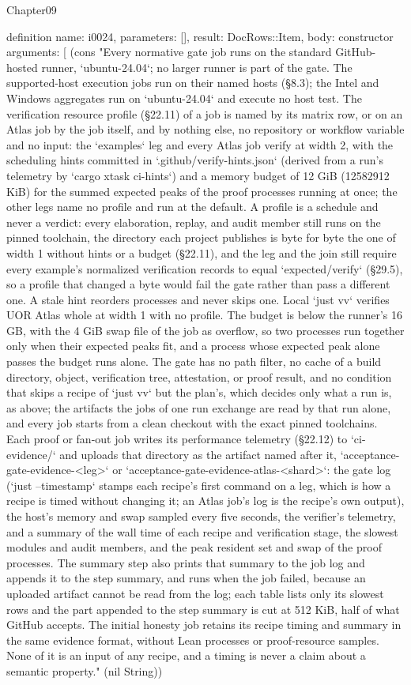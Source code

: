 \begin{lexlean}{Chapter09}
\begin{semanticmodule}
definition{
  name: i0024,
  parameters: [],
  result: DocRows::Item,
  body: constructor{
    arguments: [
      (cons "Every normative gate job runs on the standard GitHub-hosted runner, `ubuntu-24.04`; no larger runner is part of the gate. The supported-host execution jobs run on their named hosts (§8.3); the Intel and Windows aggregates run on `ubuntu-24.04` and execute no host test. The verification resource profile (§22.11) of a job is named by its matrix row, or on an Atlas job by the job itself, and by nothing else, no repository or workflow variable and no input: the `examples` leg and every Atlas job verify at width 2, with the scheduling hints committed in `.github/verify-hints.json` (derived from a run's telemetry by `cargo xtask ci-hints`) and a memory budget of 12 GiB (12582912 KiB) for the summed expected peaks of the proof processes running at once; the other legs name no profile and run at the default. A profile is a schedule and never a verdict: every elaboration, replay, and audit member still runs on the pinned toolchain, the directory each project publishes is byte for byte the one of width 1 without hints or a budget (§22.11), and the leg and the join still require every example's normalized verification records to equal `expected/verify` (§29.5), so a profile that changed a byte would fail the gate rather than pass a different one. A stale hint reorders processes and never skips one. Local `just vv` verifies UOR Atlas whole at width 1 with no profile. The budget is below the runner's 16 GB, with the 4 GiB swap file of the job as overflow, so two processes run together only when their expected peaks fit, and a process whose expected peak alone passes the budget runs alone. The gate has no path filter, no cache of a build directory, object, verification tree, attestation, or proof result, and no condition that skips a recipe of `just vv` but the plan's, which decides only what a run is, as above; the artifacts the jobs of one run exchange are read by that run alone, and every job starts from a clean checkout with the exact pinned toolchains. Each proof or fan-out job writes its performance telemetry (§22.12) to `ci-evidence/` and uploads that directory as the artifact named after it, `acceptance-gate-evidence-<leg>` or `acceptance-gate-evidence-atlas-<shard>`: the gate log (`just --timestamp` stamps each recipe's first command on a leg, which is how a recipe is timed without changing it; an Atlas job's log is the recipe's own output), the host's memory and swap sampled every five seconds, the verifier's telemetry, and a summary of the wall time of each recipe and verification stage, the slowest modules and audit members, and the peak resident set and swap of the proof processes. The summary step also prints that summary to the job log and appends it to the step summary, and runs when the job failed, because an uploaded artifact cannot be read from the log; each table lists only its slowest rows and the part appended to the step summary is cut at 512 KiB, half of what GitHub accepts. The initial honesty job retains its recipe timing and summary in the same evidence format, without Lean processes or proof-resource samples. None of it is an input of any recipe, and a timing is never a claim about a semantic property." (nil String))
}}
\end{semanticmodule}
\end{lexlean}

